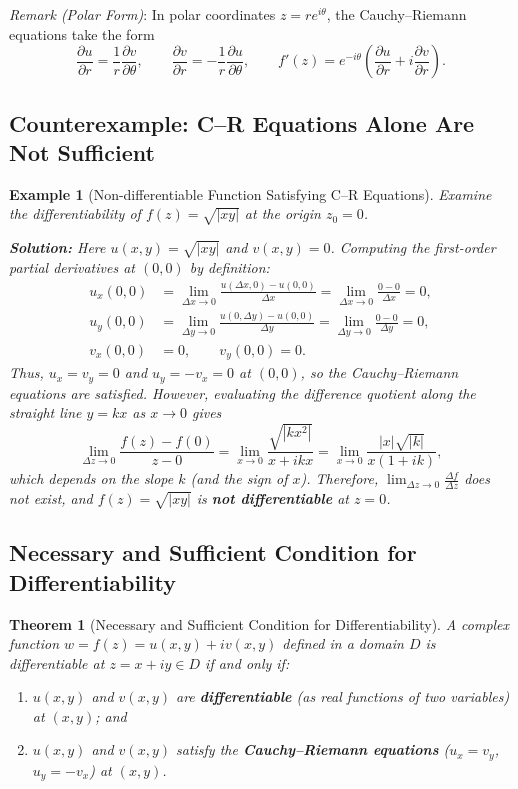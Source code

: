 \documentclass[11pt,a4paper]{article}
\theoremstyle{breakdef}
\newtheorem{example}{Example}
\theoremstyle{breakthm}
\newtheorem{theorem}{Theorem}
\begin{document}
\textit{Remark (Polar Form)}: In polar coordinates $z = re^{i\theta}$, the Cauchy--Riemann equations take the form
\[
    \frac{\partial u}{\partial r} = \frac{1}{r}\frac{\partial v}{\partial \theta}, \qquad \frac{\partial v}{\partial r} = -\frac{1}{r}\frac{\partial u}{\partial \theta}, \qquad f'(z) = e^{-i\theta}\left(\frac{\partial u}{\partial r} + i\frac{\partial v}{\partial r}\right).
\]

\subsection{Counterexample: C--R Equations Alone Are Not Sufficient}

\begin{example}[Non-differentiable Function Satisfying C--R Equations]
Examine the differentiability of $f(z) = \sqrt{|xy|}$ at the origin $z_0 = 0$.

\textbf{Solution:} Here $u(x, y) = \sqrt{|xy|}$ and $v(x, y) = 0$. Computing the first-order partial derivatives at $(0, 0)$ by definition:
\begin{align*}
    u_x(0, 0) &= \lim_{\Delta x \to 0} \frac{u(\Delta x, 0) - u(0, 0)}{\Delta x} = \lim_{\Delta x \to 0} \frac{0 - 0}{\Delta x} = 0, \\
    u_y(0, 0) &= \lim_{\Delta y \to 0} \frac{u(0, \Delta y) - u(0, 0)}{\Delta y} = \lim_{\Delta y \to 0} \frac{0 - 0}{\Delta y} = 0, \\
    v_x(0, 0) &= 0, \qquad v_y(0, 0) = 0.
\end{align*}
Thus, $u_x = v_y = 0$ and $u_y = -v_x = 0$ at $(0, 0)$, so the Cauchy--Riemann equations are satisfied. However, evaluating the difference quotient along the straight line $y = kx$ as $x \to 0$ gives
\[
    \lim_{\Delta z \to 0} \frac{f(z) - f(0)}{z - 0} = \lim_{x \to 0} \frac{\sqrt{|kx^2|}}{x + ikx} = \lim_{x \to 0} \frac{|x|\sqrt{|k|}}{x(1 + ik)},
\]
which depends on the slope $k$ (and the sign of $x$). Therefore, $\lim_{\Delta z \to 0} \frac{\Delta f}{\Delta z}$ does not exist, and $f(z) = \sqrt{|xy|}$ is \textbf{not differentiable} at $z = 0$.
\end{example}

\subsection{Necessary and Sufficient Condition for Differentiability}

\begin{theorem}[Necessary and Sufficient Condition for Differentiability]
A complex function $w = f(z) = u(x, y) + iv(x, y)$ defined in a domain $D$ is differentiable at $z = x + iy \in D$ if and only if:
\begin{enumerate}
    \item $u(x, y)$ and $v(x, y)$ are \textbf{differentiable} (as real functions of two variables) at $(x, y)$; and
    \item $u(x, y)$ and $v(x, y)$ satisfy the \textbf{Cauchy--Riemann equations} ($u_x = v_y$, $u_y = -v_x$) at $(x, y)$.
\end{enumerate}
\end{theorem}
\end{document}
